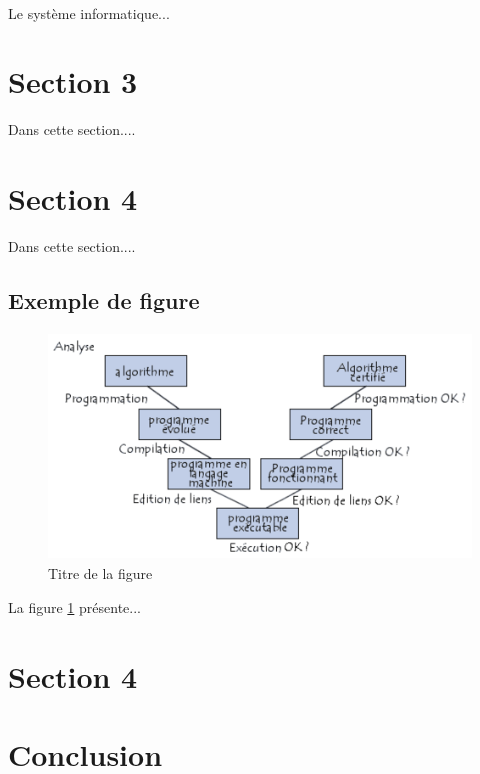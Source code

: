 \paragraph{}
Le système informatique...

\section{Section 3}
Dans cette section....
\section{Section 4}
Dans cette section....

\subsection{Exemple de figure}
\begin{figure}[h]
\centering
\includegraphics[width=15cm, height=6cm]{Imag/Fig1}
\caption{Titre de la figure}
\label{fig:Fig1}
\end{figure}
La figure \ref{fig:Fig1} présente...
\section{Section 4}
\section{Conclusion}
